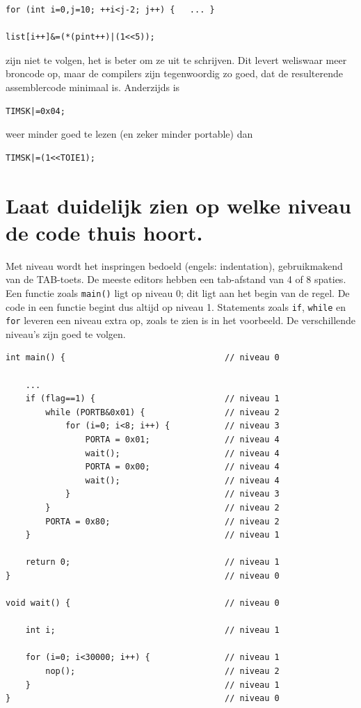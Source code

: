 \documentclass[12pt,a4paper,final,twoside,fleqn]{article}
\def\lstC{\lstinline[style=C]}
\begin{document}
\begin{lstlisting}[style=C,numbers=none,belowcaptionskip=-12pt]
for (int i=0,j=10; ++i<j-2; j++) {	 ... }

list[i++]&=(*(pint++)|(1<<5));
\end{lstlisting}

zijn niet te volgen, het is beter om ze uit te schrijven. Dit levert weliswaar
meer broncode op, maar de compilers zijn tegenwoordig zo goed, dat de resulterende
assemblercode minimaal is. Anderzijds is

\begin{lstlisting}[style=C,numbers=none,belowcaptionskip=-12pt]
TIMSK|=0x04;
\end{lstlisting}

weer minder goed te lezen (en zeker minder portable) dan

\begin{lstlisting}[style=C,numbers=none,belowcaptionskip=-12pt]
TIMSK|=(1<<TOIE1);
\end{lstlisting}

\section{Laat duidelijk zien op welke niveau de code thuis hoort.}
Met niveau wordt het inspringen bedoeld (engels: indentation), gebruikmakend van
de TAB-toets. De meeste editors hebben een tab-afstand van 4 of 8 spaties. Een
functie zoals \lstC{main()} ligt op niveau 0; dit ligt aan het begin van de regel.
De code in een functie begint dus altijd op niveau 1. Statements zoals \lstC{if},
\lstC{while} en \lstC{for} leveren een niveau extra op, zoals te zien is in het
voorbeeld. De verschillende niveau's zijn goed te volgen.

\begin{lstlisting}[style=C,caption=Voorbeeld van code met inspringen]
int main() {                                // niveau 0

	...
	if (flag==1) {                          // niveau 1
		while (PORTB&0x01) {                // niveau 2
			for (i=0; i<8; i++) {           // niveau 3
				PORTA = 0x01;               // niveau 4
				wait();                     // niveau 4
				PORTA = 0x00;               // niveau 4
				wait();                     // niveau 4
			}                               // niveau 3
		}                                   // niveau 2
		PORTA = 0x80;                       // niveau 2
	}                                       // niveau 1

	return 0;                               // niveau 1
}                                           // niveau 0

void wait() {                               // niveau 0

	int i;                                  // niveau 1

	for (i=0; i<30000; i++) {               // niveau 1
		nop();                              // niveau 2
	}                                       // niveau 1
}                                           // niveau 0
\end{lstlisting}
\end{document}
